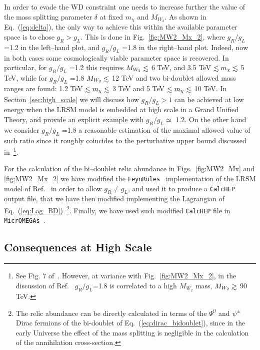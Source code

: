 \documentclass[11pt]{article}
\newcommand{\lsim}{\mathrel{\mathop{\kern 0pt \rlap
      {\raise.2ex\hbox{$<$}}}\lower.9ex\hbox{\kern-.190em $ \sim$}}}
\newcommand{\gsim}{\mathrel{\mathop{\kern 0pt
      \rlap{\raise.2ex\hbox{$>$}}}\lower.9ex\hbox{\kern-.190em $\sim$}}}
\begin{document}
In order to evade the WD constraint one needs to increase further the value of the mass splitting parameter $\delta$ at fixed $m_\chi$ and $M_{W_2}$. As shown in Eq.~(\ref{eq:delta}), the only way to achieve this within the available parameter space is to chose $g_R>g_L$. 
This is done in Fig.~\ref{fig:MW2_Mx_2}, where $g_R/g_L$ =1.2 in the left--hand plot, and $g_R/g_L$ =1.8 in the right--hand plot. Indeed, now in both cases some cosmologically viable parameter space is recovered. In particular, for $g_R/g_L$ =1.2 this requires $M_{W_2}\lsim$ 6 TeV, and 3.5 TeV $\lsim m_\chi\lsim$ 5 TeV, while for $g_R/g_L$ =1.8 $M_{W_2}\lsim$ 12 TeV and two bi-doublet allowed mass ranges are found: 1.2 TeV $\lsim m_\chi\lsim$ 3 TeV and 5 TeV $\lsim m_\chi\lsim$ 10 TeV. In Section~\ref{sec:high_scale} we will discuss how $g_R/g_L>1$ can be achieved at low energy when the LRSM model is embedded at high scale in a Grand Unified Theory, and provide an explicit example with $g_R/g_L\simeq$ 1.2. On the other hand we consider $g_R/g_L$ =1.8 a reasonable estimation of the maximal allowed value of such ratio since it roughly coincides to the perturbative upper bound discussed in~\cite{gr_gl_perturbativity}\footnote{See Fig. 7 of~\cite{gr_gl_perturbativity}. However, at variance with Fig.~\ref{fig:MW2_Mx_2}, in the discussion of Ref.~\cite{gr_gl_perturbativity} $g_R/g_L$=1.8 is correlated to a high $M_{W_2}$ mass, $M_{W_2}\gsim$ 90 TeV.}. 

For the calculation of the bi--doublet relic abundance in Figs.~\ref{fig:MW2_Mx} and \ref{fig:MW2_Mx_2}  we have modified the \verb|FeynRules|~\cite{feynrules} implementation of the LRSM model of Ref.~\cite{LR_feynrules} in order to allow $g_R\ne g_L$, and used it to produce a \verb|CalcHEP|~\cite{calchep} output file, that we have then modified implementing the Lagrangian of Eq.~(\ref{eq:Lag_BD})~\footnote{The relic abundance can be directly calculated in terms of the $\Psi^0$ and $\psi^{\pm}$ Dirac fermions of the bi-doublet of Eq.~(\ref{eq:dirac_bidoublet}), since in the early Universe the effect of the mass splitting is negligible in the calculation of the annihilation cross-section.}. Finally, we have used such modified \verb|CalcHEP| file in \verb|MicrOMEGAs|~\cite{micromegas}. 

\subsection{Consequences at High Scale \label{sec:high_scale}} %
\end{document}
